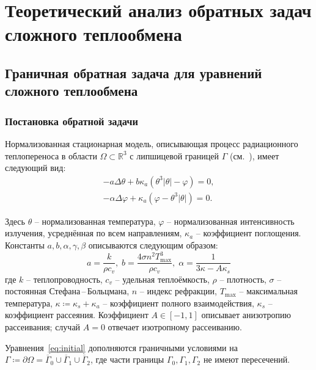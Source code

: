 \chapter{Теоретический анализ обратных задач сложного теплообмена}\label{ch:ch2}


\section{Граничная обратная задача для уравнений сложного теплообмена}\label{sec:ch2_sec1}

\subsection{Постановка обратной задачи}\label{subsec:1_init}

Нормализованная стационарная модель, описывающая процесс радиационного теплопереноса в
области $\Omega \subset \mathbb{R}^3$ с липшицевой границей $\Gamma$ (см.~\cite{OControl_1}), имеет следующий вид:
\begin{equation}
    \label{eq:initial}
    \begin{aligned}
        - a \Delta \theta + b \kappa_a(\theta ^ 3 | \theta | - \varphi) = 0,  \\
        - \alpha \Delta \varphi + \kappa_a (\varphi - \theta ^3 | \theta |) = 0.
    \end{aligned}
\end{equation}

Здесь $\theta$ -- нормализованная температура, $\varphi$ -- нормализованная интенсивность излучения,
усреднённая по всем направлениям, $\kappa_a$ -- коэффициент поглощения.
Константы $a, b, \alpha, \gamma, \beta$ описываются следующим образом:
\[
    a = \frac{k}{\rho c_v}, \; b = \frac{4 \sigma n^2 T^3_{\max}}{\rho c_v}, \;
    \alpha = \frac{1}{3\kappa -A \kappa_s}
\]
где $k$ -- теплопроводность, $c_v$ -- удельная теплоёмкость, $\rho$ -- плотность,
$\sigma$ -- постоянная Стефана\,--\,Больцмана, $n$ -- индекс рефракции,
$T_{\max}$ -- максимальная температура,
$\kappa \coloneqq \kappa_s + \kappa_a$ -- коэффициент полного взаимодействия,
$\kappa_s$ -- коэффициент рассеяния.
Коэффициент $A \in [-1,1]$ описывает анизотропию рассеивания;
случай $A=0$ отвечает изотропному рассеиванию.

Уравнения~\eqref{eq:initial} дополняются граничными условиями на
$\Gamma \coloneqq \partial \Omega =\overline{\Gamma}_0 \cup \overline{\Gamma}_1 \cup \overline{\Gamma}_2$,
где части границы $\Gamma_0, \Gamma_1, \Gamma_2$ не имеют пересечений.

